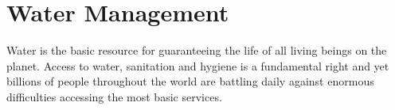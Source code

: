 
\chapter{Water Management}



Water is the basic resource for guaranteeing the life of all living beings on the planet. Access to water, sanitation and hygiene is a fundamental right and yet billions of people throughout the world are battling daily against enormous difficulties accessing the most basic services.\\

